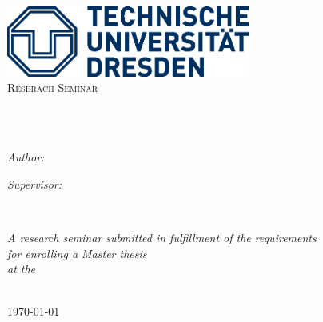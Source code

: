 \documentclass[
10pt, %
oneside, %
english, %
onehalfspacing, %
nolistspacing, %
liststotoc, %
headsepline, %
chapterinoneline, %
]{MastersThesis} %
\author{Niklas \textsc{Paulig}} %
\begin{document}
\frontmatter %

\pagestyle{plain} %


\begin{titlepage}
\begin{center}

\includegraphics[width=0.6\textwidth]{Figures/TU_Dresden_Logo_HKS41}\vspace{1.5cm}\\ %
\textsc{\Large Reserach Seminar}\\[0.5cm]

\HRule \\[0.4cm] 
{\huge \bfseries \ttitle\par}\vspace{0.4cm}
\HRule \\[1.5cm] 
 
\begin{minipage}[t]{0.4\textwidth}
\begin{flushleft} \large
\emph{Author:}\\
{\authorname} 
\end{flushleft}
\end{minipage}
\begin{minipage}[t]{0.4\textwidth}
\begin{flushright} \large
\emph{Supervisor:} \\
\href{https://tu-dresden.de/bu/wirtschaft/vwl/oeko/die-professur/beschaeftigte-mitarbeiter-team}{\supname} %
\end{flushright}
\end{minipage}\\[2cm]
 
\vfill

\large \textit{A research seminar submitted in fulfillment of the requirements\\ for enrolling a Master thesis}\\[0.3cm] %
\textit{at the}\\[0.4cm]
\deptname\\[1.5cm] %
 
\vfill

{\large \today}\\[1cm] %

 
\vfill
\end{center}
\end{titlepage}
\end{document}
